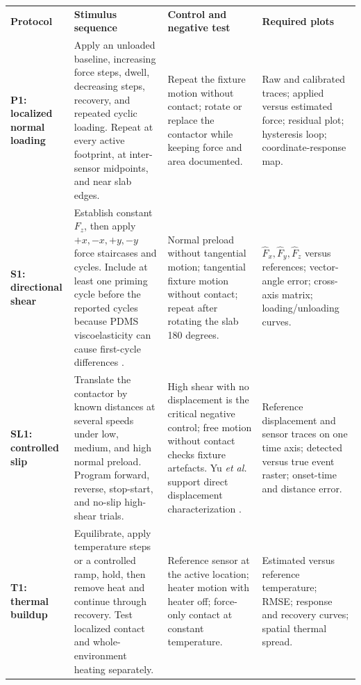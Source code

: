 \begingroup
\fontsize{8.35}{9.8}\selectfont
\setlength{\tabcolsep}{3pt}
\renewcommand{\arraystretch}{1.13}
\begin{tabularx}{\linewidth}{>{\raggedright\arraybackslash\bfseries\color{AUBRed}}p{2.8cm}
                            >{\raggedright\arraybackslash}p{5.0cm}Y Y}
\color{white}\textbf{Protocol} &
\color{white}\textbf{Stimulus sequence} &
\color{white}\textbf{Control and negative test} &
\color{white}\textbf{Required plots} \\
P1: localized normal loading & Apply an unloaded baseline, increasing force
steps, dwell, decreasing steps, recovery, and repeated cyclic loading. Repeat
at every active footprint, at inter-sensor midpoints, and near slab edges. &
Repeat the fixture motion without contact; rotate or replace the contactor while
keeping force and area documented. & Raw and calibrated traces; applied versus
estimated force; residual plot; hysteresis loop; coordinate-response map. \\
S1: directional shear & Establish constant $F_z$, then apply $+x,-x,+y,-y$
force staircases and cycles. Include at least one priming cycle before the
reported cycles because PDMS viscoelasticity can cause first-cycle differences
\cite{albrecht2019}. & Normal preload without tangential motion; tangential
fixture motion without contact; repeat after rotating the slab 180 degrees. &
$\widehat F_x,\widehat F_y,\widehat F_z$ versus references; vector-angle error;
cross-axis matrix; loading/unloading curves. \\
SL1: controlled slip & Translate the contactor by known distances at several
speeds under low, medium, and high normal preload. Program forward, reverse,
stop-start, and no-slip high-shear trials. & High shear with no displacement is
the critical negative control; free motion without contact checks fixture
artefacts. Yu \textit{et al.} support direct displacement characterization
\cite{q3yu2024}. & Reference displacement and sensor traces on
one time axis; detected versus true event raster; onset-time and distance error. \\
T1: thermal buildup & Equilibrate, apply temperature steps or a controlled ramp,
hold, then remove heat and continue through recovery. Test localized contact
and whole-environment heating separately. & Reference sensor at the active
location; heater motion with heater off; force-only contact at constant
temperature. & Estimated versus reference temperature; RMSE; response and
recovery curves; spatial thermal spread. \\

\end{tabularx}
